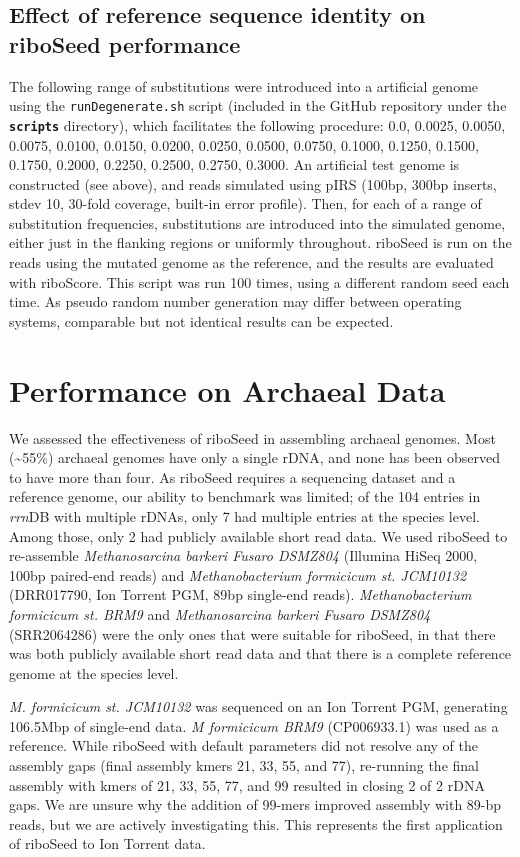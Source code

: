 \documentclass[10pt]{article}
\def \ttilde {\raisebox{-.5ex}\textasciitilde} %
\begin{document}
\subsection*{Effect of reference sequence identity on riboSeed performance}
The following range of substitutions were introduced into a artificial genome using the \texttt{runDegenerate.sh} script (included in the GitHub repository under the \textbf{\texttt{scripts}} directory), which facilitates the following procedure: 0.0, 0.0025, 0.0050, 0.0075, 0.0100, 0.0150, 0.0200, 0.0250, 0.0500, 0.0750, 0.1000, 0.1250, 0.1500, 0.1750, 0.2000, 0.2250, 0.2500, 0.2750, 0.3000. An artificial test genome is constructed (see above), and reads simulated using pIRS (100bp, 300bp inserts, stdev 10, 30-fold coverage, built-in error profile).  Then, for each of a range of substitution frequencies, substitutions are introduced into the simulated genome, either just in the flanking regions or uniformly throughout. riboSeed is run on the reads using the mutated genome as the reference, and the results are evaluated with riboScore. This script was run 100 times, using a different random seed each time.  As pseudo random number generation may differ between operating systems, comparable but not identical results can be expected.

\section*{Performance on Archaeal Data}

We assessed the effectiveness of riboSeed in assembling archaeal genomes. Most (\ttilde55\%) archaeal genomes have only a single rDNA, and none has been observed to have more than four. As riboSeed requires a sequencing dataset and a reference genome, our ability to benchmark was limited; of the 104 entries in \textit{rrn}DB with multiple rDNAs, only 7 had multiple entries at the species level. Among those, only 2 had publicly available short read data. We used riboSeed to re-assemble \textit{Methanosarcina barkeri Fusaro DSMZ804} (Illumina HiSeq 2000, 100bp paired-end reads) and \textit{Methanobacterium formicicum st. JCM10132} (DRR017790, Ion Torrent PGM, 89bp single-end reads). \textit{Methanobacterium formicicum st. BRM9} and \textit{Methanosarcina barkeri Fusaro DSMZ804} (SRR2064286) were the only ones that were suitable for riboSeed, in that there was both publicly available short read data and that there is a complete reference genome at the species level.

\textit{M. formicicum st. JCM10132} was sequenced on an Ion Torrent PGM, generating 106.5Mbp of single-end data. \textit{M formicicum BRM9} (CP006933.1) was used as a reference. While riboSeed with default parameters did not resolve any of the assembly gaps (final assembly kmers 21, 33, 55, and 77), re-running the final assembly with kmers of 21, 33, 55, 77, and 99 resulted in closing 2 of 2 rDNA gaps. We are unsure why the addition of 99-mers improved assembly with 89-bp reads, but we are actively investigating this. This represents the first application of riboSeed to Ion Torrent data.
\end{document}
